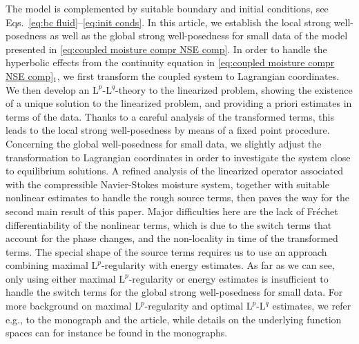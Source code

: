 \documentclass[10pt]{amsart}
\theoremstyle{plain}
\theoremstyle{definition}
\theoremstyle{thm}
\numberwithin{equation}{section}
\newcommand{\rL}{\mathrm{L}}
\begin{document}
The model is complemented by suitable boundary and initial conditions, see Eqs.~\eqref{eq:bc fluid}--\eqref{eq:init conds}.
In this article, we establish the local strong well-posedness as well as the global strong well-posedness for small data of the model presented in \eqref{eq:coupled moisture compr NSE comp}.
In order to handle the hyperbolic effects from the continuity equation in \eqref{eq:coupled moisture compr NSE comp}$_1$, we first transform the coupled system to Lagrangian coordinates.
We then develop an $\rL^p$-$\rL^q$-theory to the linearized problem, showing the existence of a unique solution to the linearized problem, and providing a priori estimates in terms of the data.
Thanks to a careful analysis of the transformed terms, this leads to the local strong well-posedness by means of a fixed point procedure.
Concerning the global well-posedness for small data, we slightly adjust the transformation to Lagrangian coordinates in order to investigate the system close to equilibrium solutions.
A refined analysis of the linearized operator associated with the compressible Navier-Stokes moisture system, together with suitable nonlinear estimates to handle the rough source terms, then paves the way for the second main result of this paper.
Major difficulties here are the lack of Fr\'echet differentiability of the nonlinear terms, which is due to the switch terms that account for the phase changes, and the non-locality in time of the transformed terms.
The special shape of the source terms requires us to use an approach combining maximal $\rL^p$-regularity with energy estimates.
As far as we can see, only using either maximal $\rL^p$-regularity or energy estimates is insufficient to handle the switch terms for the global strong well-posedness for small data.
For more background on maximal $\rL^p$-regularity and optimal $\rL^p$-$\rL^q$ estimates, we refer e.g., to the monograph\cite{DHP:03} and the article\cite{DHP:07}, while details on the underlying function spaces can for instance be found in the monographs\cite{Ama:19,Tri:78}.
\end{document}
